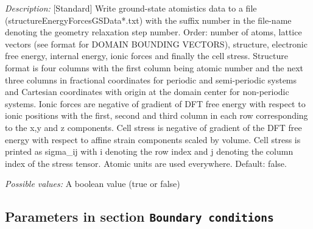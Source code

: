 \begin{itemize}
{\it Description:} [Standard] Write ground-state atomistics data to a file (structureEnergyForcesGSData*.txt) with the suffix number in the file-name denoting the geometry relaxation step number. Order: number of atoms, lattice vectors (see format for DOMAIN BOUNDING VECTORS), structure, electronic free energy, internal energy, ionic forces and finally the cell stress. Structure format is four columns with the first column being atomic number and the next three columns in fractional coordinates for periodic and semi-periodic systems and Cartesian coordinates with origin at the domain center for non-periodic systems. Ionic forces are negative of gradient of DFT free energy with respect to ionic positions with the first, second and third column in each row corresponding to the x,y and z components. Cell stress is negative of gradient of the DFT free energy with respect to affine strain components scaled by volume. Cell stress is printed as sigma_{ij} with i denoting the row index and j denoting the column index of the stress tensor. Atomic units are used everywhere. Default: false.


{\it Possible values:} A boolean value (true or false)
\end{itemize}



\subsection{Parameters in section \tt Boundary conditions}
\label{parameters:Boundary_20conditions}

